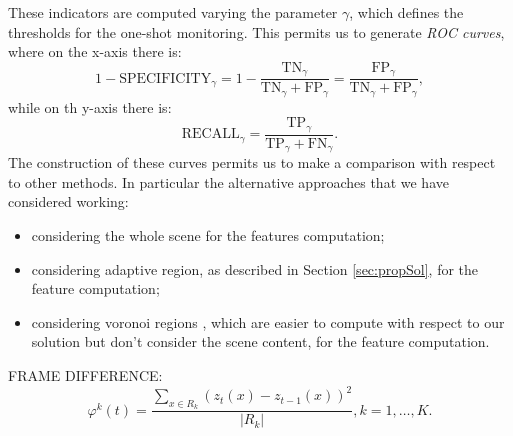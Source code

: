 \documentclass{llncs}
\begin{document}
These indicators are computed varying the parameter $\gamma$, which defines the thresholds for the one-shot monitoring. 
This permits us to generate \textit{ROC curves}, where on the x-axis there is:
\[1-\text{SPECIFICITY}_\gamma = 1-\frac{\text{TN}_\gamma}{\text{TN}_\gamma+\text{FP}_\gamma}=\frac{\text{FP}_\gamma}{\text{TN}_\gamma+\text{FP}_\gamma},\]
while on th y-axis there is:
\[\text{RECALL}_\gamma=\frac{\text{TP}_\gamma}{\text{TP}_\gamma+\text{FN}_\gamma}.\]
The construction of these curves permits us to make a comparison with respect to other methods.
In particular the alternative approaches that we have considered working:
\begin{itemize}
\item considering the whole scene for the features computation;
\item considering adaptive region, as described in Section \ref{sec:propSol}, for the feature computation;
\item considering voronoi regions \cite{aurenhammer1991voronoi}, which are easier to compute with respect to our solution but don't consider the scene content, for the feature computation.
\end{itemize}

FRAME DIFFERENCE:
\begin{equation}
	\label{eq:frameDiffReg}
	\varphi^k(t) = \frac{\sum_{x \in R_k}(z_t(x) - z_{t-1}(x))^2}{|R_k|}, k=1,\dots,K.
\end{equation}
\end{document}
